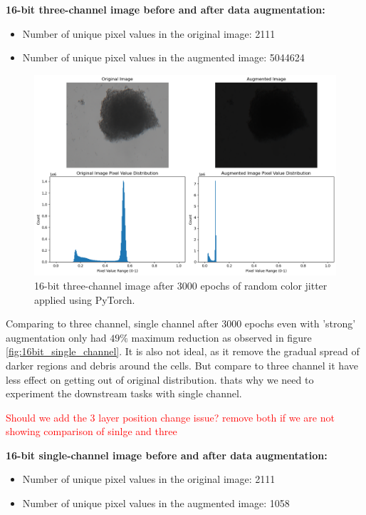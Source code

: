   \textbf{16-bit three-channel image before and after data augmentation:}
  \begin{itemize}
    \item Number of unique pixel values in the original image: 2111
    \item Number of unique pixel values in the augmented image: 5044624
  \end{itemize}
  
  \begin{figure}[H]
    \centering
    \includegraphics[scale=0.5]{figures/16bit_three_1.png} 
    \caption{16-bit three-channel image after 3000 epochs of random color jitter applied using PyTorch.}
    \label{fig:16bit_three_v1}
  \end{figure}

  Comparing to three channel, single channel after 3000 epochs even with 'strong' augmentation only had $49\%$ maximum reduction  as observed in figure 
  \ref{fig:16bit_single_channel}. It is also not ideal, as it remove the gradual spread of darker regions and  debris around the cells. But compare to three channel
   it have less effect on getting out of original distribution. thats why we need to experiment the downstream tasks with  single channel.

  \textcolor{red}{Should we add the 3 layer position change issue? remove both if we are not showing comparison of sinlge and three }
  
  \textbf{16-bit single-channel image before and after data augmentation:}
  \begin{itemize}
    \item Number of unique pixel values in the original image: 2111
    \item Number of unique pixel values in the augmented image: 1058
  \end{itemize}
  
